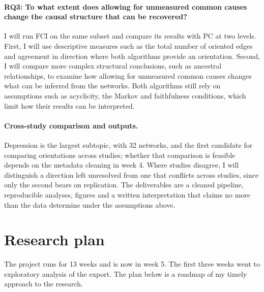 \documentclass[a4paper]{article}
\begin{document}
\paragraph{RQ3: To what extent does allowing for unmeasured common causes change the causal structure that can be recovered?} I will run FCI on the same subset and compare its results with PC at two levels. First, I will use descriptive measures such as the total number of oriented edges and agreement in direction where both algorithms provide an orientation. Second, I will compare more complex structural conclusions, such as ancestral relationships, to examine how allowing for unmeasured common causes changes what can be inferred from the networks. Both algorithms still rely on assumptions such as acyclicity, the Markov and faithfulness conditions, which limit how their results can be interpreted.

\paragraph{Cross-study comparison and outputs.} Depression is the largest subtopic, with
32 networks, and the first candidate for comparing orientations across studies; whether
that comparison is feasible depends on the metadata cleaning in week 4. Where studies
disagree, I will distinguish a direction left unresolved from one that conflicts across
studies, since only the second bears on replication. The deliverables are a cleaned
pipeline, reproducible analyses, figures and a written interpretation that claims no
more than the data determine under the assumptions above.

\section{Research plan}

The project runs for 13 weeks and is now in week 5. The first three weeks went to
exploratory analysis of the export. The plan below is a roadmap of my timely approach to the research. 
\end{document}
